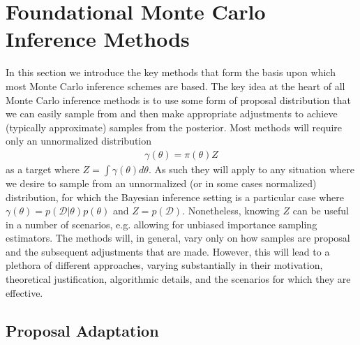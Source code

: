 
\section{Foundational Monte Carlo Inference Methods}
\label{sec:inf:foundation}

In this section we introduce the key methods that form
the basis upon which most Monte Carlo inference schemes are based.  The
key idea at the heart of all Monte Carlo inference methods is to use some form
of proposal distribution that we can easily sample from and then make
appropriate adjustments to achieve (typically approximate) samples from
the posterior.  Most methods will require only an unnormalized distribution
\begin{align}
\label{eq:inf:unnorm-target}
\gamma(\theta) = \pi(\theta)Z
\end{align}
as a target where $Z = \int \gamma(\theta) d\theta$.  As such they will apply to
any situation where we desire to sample from an unnormalized 
(or in some cases normalized) distribution, for which
the Bayesian inference setting is a particular case where
$\gamma(\theta) = p(\mathcal{D}|\theta)p(\theta)$ and $Z = p(\mathcal{D})$.
Nonetheless, knowing $Z$ can be useful in a number of scenarios, e.g. allowing
for unbiased importance sampling estimators.
The methods will, in general, vary only on how samples are proposal
and the subsequent adjustments that are made.  However, this will lead to a
plethora of different approaches, varying substantially in their motivation,
theoretical justification, algorithmic details, and the scenarios for which they
are effective.






\subsection{Proposal Adaptation}
\label{sec:inf:proposal-adapt}

